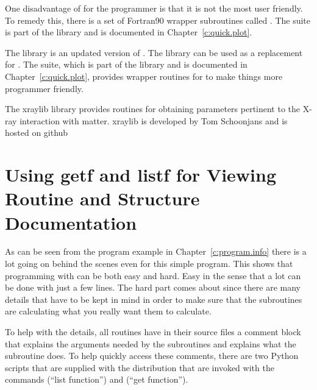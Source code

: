 {{{{{{\begin{description}
One disadvantage of  for the programmer is that it is not the most user friendly. To
remedy this, there is a set of Fortran90 wrapper subroutines called .  The
 suite is part of the  library and is documented in
Chapter~\ref{c:quick.plot}.
%
  \item[plplot] \Newline
The  library is an updated version of . The  library can be used as
a replacement for . The  suite, which is part of the 
library and is documented in Chapter~\ref{c:quick.plot}, provides wrapper routines for 
to make things more programmer friendly.
%
  \item[xraylib] \Newline
The xraylib library provides routines for obtaining parameters pertinent to the X-ray interaction
with matter. xraylib is developed by Tom Schoonjans and is hosted on github\cite{b:xraylib}

\end{description}

\section{Using getf and listf for Viewing Routine and Structure Documentation}
\label{s:getf}

As can be seen from the program example in Chapter~\ref{c:program.info}
there is a lot going on behind the scenes even for this
simple program. This shows that programming with \bmad can be both easy
and hard. Easy in the sense that a lot can be done with just a few
lines. The hard part comes about since there are many details that
have to be kept in mind in order to make sure that the subroutines
are calculating what you really want them to calculate.

To help with the details, all \bmad routines have in their source
files a comment block that explains the arguments needed by the
subroutines and explains what the subroutine does. To help quickly
access these comments, there are two Python scripts that are supplied
with the \bmad distribution that are invoked with the commands
 (``list function'') and  (``get function'').

}}}}}}
